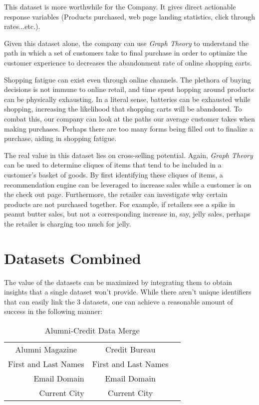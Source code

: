 \documentclass[letterpaper,12pt]{article}
\begin{document}
This dataset is more worthwhile for the Company.  It gives direct actionable response variables (Products purchased, web page landing statistics, click through rates...etc.).

Given this dataset alone, the company can use \emph{Graph Theory} to understand the path in which a set of customers take to final purchase in order to optimize the customer experience to decreases the abandonment rate of online shopping carts.

Shopping fatigue can exist even through online channels.  The plethora of buying decisions is not immune to online retail, and time spent hopping around products can be physically exhausting.  In a literal sense, batteries can be exhausted while shopping, increasing the likelihood that shopping carts will be abandoned.  To combat this, our company can look at the paths our average customer takes when making purchases.  Perhaps there are too many forms being filled out to finalize a purchase, aiding in shopping fatigue.

The real value in this dataset lies on cross-selling potential.  Again, \emph{Graph Theory} can be used to determine cliques of items that tend to be included in a customer's basket of goods.  By first identifying these cliques of items, a recommendation engine can be leveraged to increase sales while a customer is on the check out page.  Furthermore, the retailer can investigate why certain products are not purchased together.  For example, if retailers see a spike in peanut butter sales, but not a corresponding increase in, say, jelly sales, perhaps the retailer is charging too much for jelly.

\section{Datasets Combined}
The value of the datasets can be maximized by integrating them to obtain insights that a single dataset won't provide.  While there aren't unique identifiers that can easily link the 3 datasets, one can achieve a reasonable amount of success in the following manner:

\begin{table}
  \caption{Alumni-Credit Data Merge}
  \centering
  \begin{tabular}{ |r|c|c|}
    \multicolumn{1}{c}{Alumni Magazine}
    &  \multicolumn{1}{c}{Credit Bureau} \\
    \cline{1-2}
    First and Last Names & First and Last Names \\
    \cline{1-2}
    Email Domain & Email Domain \\
    \cline{1-2}
    Current City & Current City \\
    \cline{1-2}
  \end{tabular}
\end{table}
\end{document}
